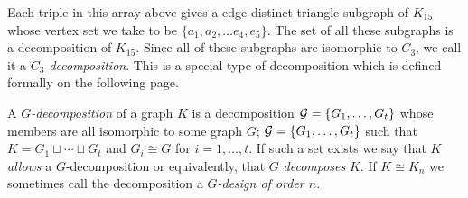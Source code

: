 \normalfont Each triple in this array above gives a edge-distinct triangle subgraph of $K_{15}$ whose vertex set we take to be $\{a_{1},a_{2},\hdots e_{4},e_{5}\}.$ The set of all these subgraphs is a decomposition of $K_{15}$. Since all of these subgraphs are isomorphic to $C_{3}$, we call it a \textit{$C_{3}$-decomposition}. This is a special type of decomposition which is defined formally on the following page.\newpage

\begin{definition}[$G$-decomposition]
A \textit{$G$-decomposition} of a graph $K$ is a decomposition $\mathcal{G} = \{G_{1},\hdots,G_{t}\}$ whose members are all isomorphic to some graph $G$; $\mathcal{G} = \{G_{1},\hdots,G_{t}\}$ such that $K=G_{1}\sqcup \cdots \sqcup G_{t}$ and $G_{i}\cong G$ for $i=1,\hdots,t$. If such a set exists we say that $K$ \textit{allows} a $G$-decomposition or equivalently, that $G$ \textit{decomposes} $K$. If $K\cong K_{n}$ we sometimes call the decomposition a \textit{$G$-design of order $n$}.
\end{definition}

